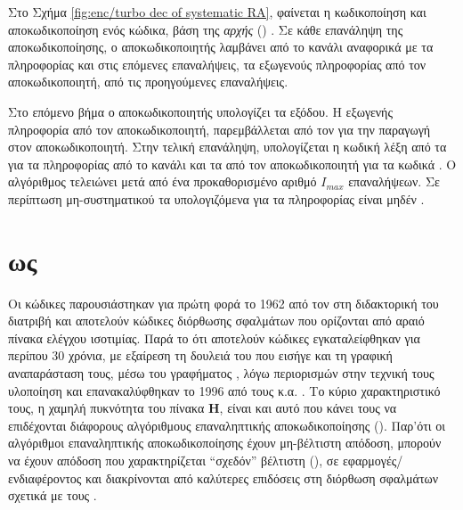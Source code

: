 Στο Σχήμα \ref{fig:enc/turbo dec of systematic RA}, φαίνεται η κωδικοποίηση και αποκωδικοποίηση  ενός  κώδικα, βάση της \textit{αρχής } () \cite{hagenauer2003turbo}. Σε κάθε επανάληψη της αποκωδικοποίησης, ο  αποκωδικοποιητής λαμβάνει  από το κανάλι αναφορικά με τα  πληροφορίας και στις επόμενες επαναλήψεις, τα  εξωγενούς πληροφορίας από τον  αποκωδικοποιητή, από τις προηγούμενες επαναλήψεις.

Στο επόμενο βήμα ο  αποκωδικοποιητής υπολογίζει τα  εξόδου. Η εξωγενής πληροφορία από τον  αποκωδικοποιητή, παρεμβάλλεται από τον  για την παραγωγή  στον  αποκωδικοποιητή. Στην τελική επανάληψη, υπολογίζεται η κωδική λέξη από τα  για τα  πληροφορίας από το κανάλι και τα  από τον  αποκωδικοποιητή για τα κωδικά . Ο αλγόριθμος τελειώνει μετά από ένα προκαθορισμένο αριθμό $I_{max}$ επαναλήψεων. Σε περίπτωση μη-συστηματικού  τα υπολογιζόμενα  για τα  πληροφορίας είναι μηδέν \cite{johnson2009iterative}.


\section{ ως }

Οι κώδικες  παρουσιάστηκαν για πρώτη φορά το 1962 από τον  στη διδακτορική του διατριβή \cite{gallager1962low} και αποτελούν κώδικες διόρθωσης σφαλμάτων που ορίζονται από αραιό πίνακα ελέγχου ισοτιμίας. Παρά το ότι αποτελούν  κώδικες εγκαταλείφθηκαν για περίπου 30 χρόνια, με εξαίρεση τη δουλειά του  \cite{tanner1981recursive} που εισήγε και τη γραφική αναπαράσταση τους, μέσω του γραφήματος , λόγω περιορισμών στην τεχνική τους υλοποίηση και επανακαλύφθηκαν το 1996 από τους  κ.α. \cite{mackay1996near}. Tο κύριο χαρακτηριστικό τους, η χαμηλή πυκνότητα του πίνακα $\mathbf{H}$, είναι και αυτό που κάνει τους  να επιδέχονται διάφορους αλγόριθμους επαναληπτικής αποκωδικοποίησης (). Παρ’ότι οι αλγόριθμοι επαναληπτικής αποκωδικοποίησης έχουν μη-βέλτιστη απόδοση, μπορούν να έχουν απόδοση που χαρακτηρίζεται “σχεδόν” βέλτιστη (), σε εφαρμογές/ ενδιαφέροντος και διακρίνονται από καλύτερες επιδόσεις στη διόρθωση σφαλμάτων σχετικά με τους .

